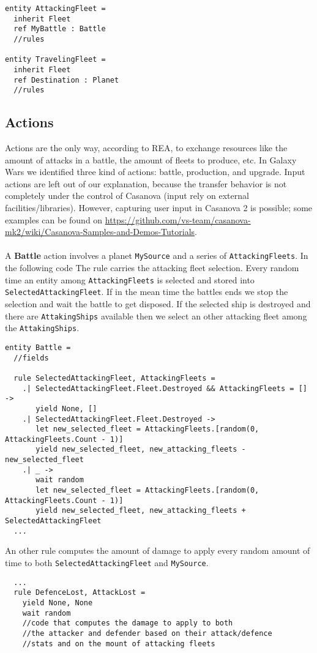 \begin{lstlisting}
entity AttackingFleet =
  inherit Fleet
  ref MyBattle : Battle
  //rules
  
entity TravelingFleet =
  inherit Fleet
  ref Destination : Planet
  //rules
\end{lstlisting}

\subsection{Actions}
Actions are the only way, according to REA, to exchange resources like the amount of attacks in a battle, the amount of fleets to produce, etc. In Galaxy Wars we identified three kind of actions: battle, production, and upgrade. Input actions are left out of our explanation, because the transfer behavior is not completely under the control of Casanova (input rely on external facilities/libraries). However, capturing user input in Casanova 2 is possible; some examples can be found on \url{https://github.com/vs-team/casanova-mk2/wiki/Casanova-Samples-and-Demos-Tutorials}. 
\\\\
\noindent
A \textbf{Battle} action involves a planet \texttt{MySource} and a series of \texttt{AttackingFleets}. In the following code The rule carries the attacking fleet selection. Every random time an entity among \texttt{AttackingFleets} is selected and stored into \texttt{SelectedAttackingFleet}. If in the mean time the battles ends we stop the selection and wait the battle to get disposed. If the selected ship is destroyed and there are \texttt{AttakingShips} available then we select an other attacking fleet among the \texttt{AttakingShips}.

\begin{lstlisting}
entity Battle =
  //fields
  
  rule SelectedAttackingFleet, AttackingFleets =
    .| SelectedAttackingFleet.Fleet.Destroyed && AttackingFleets = [] ->
       yield None, []
    .| SelectedAttackingFleet.Fleet.Destroyed ->
       let new_selected_fleet = AttackingFleets.[random(0, AttackingFleets.Count - 1)]
       yield new_selected_fleet, new_attacking_fleets - new_selected_fleet
    .| _ -> 
       wait random
       let new_selected_fleet = AttackingFleets.[random(0, AttackingFleets.Count - 1)]
       yield new_selected_fleet, new_attacking_fleets + SelectedAttackingFleet
  ...
\end{lstlisting}

\noindent
An other rule computes the amount of damage to apply every random amount of time to both \texttt{SelectedAttackingFleet} and \texttt{MySource}. 
\begin{lstlisting}
  ...
  rule DefenceLost, AttackLost =
    yield None, None
    wait random
    //code that computes the damage to apply to both
    //the attacker and defender based on their attack/defence
    //stats and on the mount of attacking fleets
\end{lstlisting}

